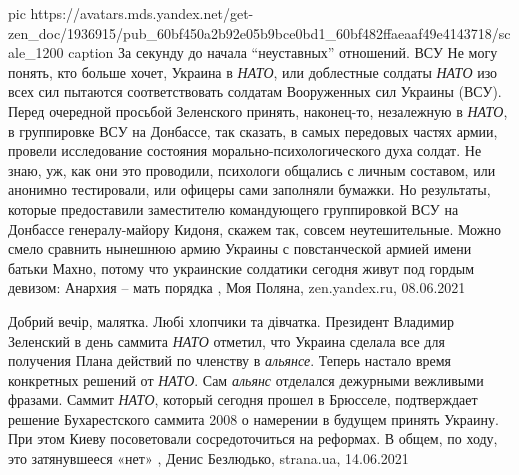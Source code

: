 \ifcmt
  pic https://avatars.mds.yandex.net/get-zen_doc/1936915/pub_60bf450a2b92e05b9bce0bd1_60bf482ffaeaaf49e4143718/scale_1200
  caption За секунду до начала \enquote{неуставных} отношений. ВСУ
\fi
Не могу понять, кто больше хочет, Украина в \emph{НАТО}, или доблестные солдаты \emph{НАТО}
изо всех сил пытаются соответствовать солдатам Вооруженных сил Украины (ВСУ).
Перед очередной просьбой Зеленского принять, наконец-то, незалежную в \emph{НАТО}, в
группировке ВСУ на Донбассе, так сказать, в самых передовых частях армии,
провели исследование состояния морально-психологического духа солдат. Не
знаю, уж, как они это проводили, психологи общались с личным составом, или
анонимно тестировали, или офицеры сами заполняли бумажки. Но результаты,
которые предоставили заместителю командующего группировкой ВСУ на Донбассе
генералу-майору Кидоня, скажем так, совсем неутешительные.  Можно смело
сравнить нынешнюю армию Украины с повстанческой армией имени батьки Махно,
потому что украинские солдатики сегодня живут под гордым девизом: Анархия –
мать порядка
, 
Моя Поляна, zen.yandex.ru, 08.06.2021

Добрий вечір, малятка. Любі хлопчики та дівчатка. Президент Владимир Зеленский
в день саммита \emph{НАТО} отметил, что Украина сделала все для получения Плана
действий по членству в \emph{альянсе}. Теперь настало время конкретных решений от
\emph{НАТО}. Сам \emph{альянс} отделался дежурными вежливыми фразами. Саммит \emph{НАТО}, который
сегодня прошел в Брюсселе, подтверждает решение Бухарестского саммита 2008 о
намерении в будущем принять Украину. При этом Киеву посоветовали
сосредоточиться на реформах. В общем, по ходу, это затянувшееся «нет»
, 
Денис Безлюдько, strana.ua, 14.06.2021


